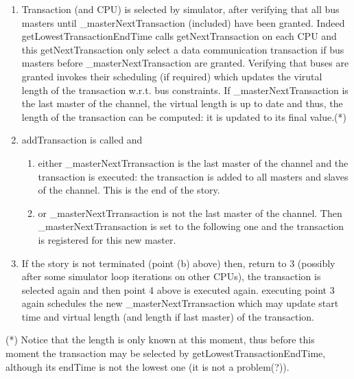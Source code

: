 \documentclass[a4paper,11pt]{article}
\newcommand{\cod}[1]{{\ttfamily #1}}
\begin{document}
\begin{itemize}
\begin{enumerate}
	  	\item  Transaction (and \cod{CPU}) is selected by simulator, after verifying that all bus masters until \cod{\_masterNextTransaction} (included) have been granted. Indeed \cod{getLowest\-Transac\-tionEndTime} calls \cod{getNextTransaction} on each CPU and this \cod{getNext\-Trans\-action} only select a data communication transaction if bus masters before \cod{\_masterNext\-Trans\-action} are granted. Verifying that buses are granted invokes their scheduling (if required) which updates the virutal length of the transaction w.r.t. bus constraints. If \cod{\_masterNextTransaction} is the last master of the channel, the virtual length is up to date and thus, the length of the transaction can be computed: it is updated to its final value.(*)
	  	\item \cod{addTransaction} is called and
	  	\begin{enumerate}
	  		\item either \cod{\_masterNextTrransaction} is the last master of the channel and the transaction is executed: the transaction is added to all masters and slaves of the channel. This is the end of the story.
	  		\item or \cod{\_masterNextTrransaction} is not the last master of the channel. Then \cod{\_masterNextTrransaction} is set to the following one and the transaction is registered for this new master. 
	  	\end{enumerate}
	  	\item If the story is not terminated (point (b) above) then, return to 3 (possibly after some simulator loop iterations on other CPUs), the transaction is selected again and then point 4 above is executed again. executing point 3 again schedules the new \cod{\_masterNextTrransaction} which may update start time and virtual length (and length if last master) of the transaction.
	  \end{enumerate}

\end{itemize}
(*) Notice that the length is only known at this moment, thus before this moment the transaction may be selected by \cod{getLowest\-Transac\-tionEndTime}, although its endTime is not the lowest one (it is not a problem(?)).
\end{document}
